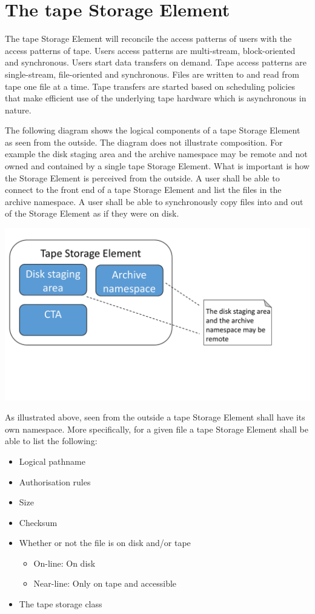 \documentclass{article}
\begin{document}
\newpage
\section{The tape Storage Element}
The tape Storage Element will reconcile the access patterns of users with the access patterns of tape.  Users access patterns are multi-stream, block-oriented and synchronous.  Users start data transfers on demand.  Tape access patterns are single-stream, file-oriented and synchronous. Files are written to and read from tape one file at a time.  Tape transfers are started based on scheduling policies that make efficient use of the underlying tape hardware which is asynchronous in nature.

The following diagram shows the logical components of a tape Storage Element as seen from the outside.  The diagram does not illustrate composition.  For example the disk staging area and the archive namespace may be remote and not owned and contained by a single tape Storage Element.  What is important is how the Storage Element is perceived from the outside.  A user shall be able to connect to the front end of a tape Storage Element and list the files in the archive namespace.  A user shall be able to synchronously copy files into and out of the Storage Element as if they were on disk.

\includegraphics[scale=0.3,trim=0mm 50mm 0mm 0mm]{CTA_tape_storage_element}

As illustrated above, seen from the outside a tape Storage Element shall have its own namespace.  More specifically, for a given file a tape Storage Element shall be able to list the following:
\begin{itemize}
	\item Logical pathname
	\item Authorisation rules
	\item Size
	\item Checksum
	\item Whether or not the file is on disk and/or tape
	\begin{itemize}
		\item On-line: On disk
		\item Near-line: Only on tape and accessible
	\end{itemize}
	\item The tape storage class
\end{itemize}
\end{document}

